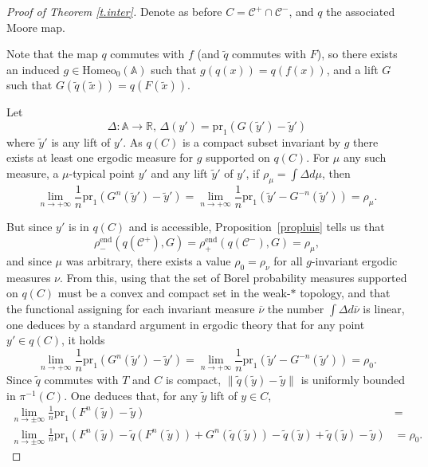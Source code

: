 \documentclass[12pt,a4paper]{amsart}
\theoremstyle{definition}
\theoremstyle{remark}
\newcommand{\R}{\mathbb{R}}
\newcommand{\A}{\mathbb{A}}
\begin{document}
\begin{proof}[Proof of Theorem \ref{t.inter}]
Denote as before $C=\mathcal{C}^{+}\cap\mathcal{C}^{-}$, and $q$ the associated Moore map. 

Note that the map $q$ commutes with $f$ (and $\widetilde q$ commutes with $F$), so there exists an induced $g\in\mathrm{Homeo}_0(\A)$ such that $g(q(x))=q(f(x))$, and a lift $G$ such that $G(\widetilde q(\widetilde x))=q(F(\widetilde x))$. 

Let
$$\Delta:\A\to\R,\,\Delta(y')=\mathrm{pr}_1(G(\widetilde y')-\widetilde y')$$
 where $\widetilde y'$ is any lift of $y'$. As $q(C)$ is a compact subset invariant by $g$ there exists at least one ergodic measure for $g$ supported on $q(C)$. For $\mu$ any such measure, a $\mu$-typical point $y'$ and any lift $\widetilde y'$ of $y'$, if $\rho_\mu=\int \Delta d\mu$, then
$$\lim_{n\to+\infty}\frac{1}{n}\mathrm{pr}_1\left(G^n(\widetilde y')-\widetilde y'\right)=\lim_{n\to+\infty}\frac{1}{n}\mathrm{pr}_1\left(\widetilde y'-G^{-n}(\widetilde y')\right)= \rho_\mu.$$

But since $y'$ is in $q(C)$ and is accessible, Proposition~\ref{propluis} tells us that 
$$\rho^{\mathrm{end}}_-(q(\mathcal{C}^{+}),G)=\rho^{\mathrm{end}}_+(q(\mathcal{C}^{-}),G)=\rho_\mu,$$
and since $\mu$ was arbitrary, there exists a value $\rho_0=\rho_\nu$ for all $g$-invariant ergodic measures $\nu$. 
{From this, using that the set of Borel probability measures supported on $q(C)$ must be a convex and compact set in the weak-$*$ topology, and that the functional assigning for each invariant measure $\overline{\nu}$ the number $\int \Delta d\overline{\nu}$ is linear, one deduces by a standard argument in ergodic theory that for any point $y'\in q(C)$, it holds}
$$\lim_{n\to+\infty}\frac{1}{n}\mathrm{pr}_1\left(G^n(\widetilde y')-\widetilde y'\right)=\lim_{n\to+\infty}\frac{1}{n}\mathrm{pr}_1\left(\widetilde y'-G^{-n}(\widetilde y')\right)= \rho_0.$$  Since  $\widetilde q$ commutes with $T$ and $C$ is compact, $\|\widetilde q(\widetilde y)- \widetilde y\|$ is uniformly bounded in $\pi^{-1}(C)$. One deduces that, for any $\widetilde y$ lift of $y\in C$,
$$
\begin{aligned}
\lim_{n\to\pm\infty}\frac{1}{n} \mathrm{pr}_1\left(F^{n}(\widetilde y)-\widetilde y\right)&=\\
\lim_{n\to\pm\infty}\frac{1}{n} \mathrm{pr}_1\left( F^{n}(\widetilde y)-\widetilde q(F^{n}(\widetilde y))+ G^{n}(\widetilde q(\widetilde y))-\widetilde q(\widetilde y)+ \widetilde q(\widetilde y)- \widetilde y\right)&=\rho_0.
\end{aligned}$$


\end{proof}
\end{document}
